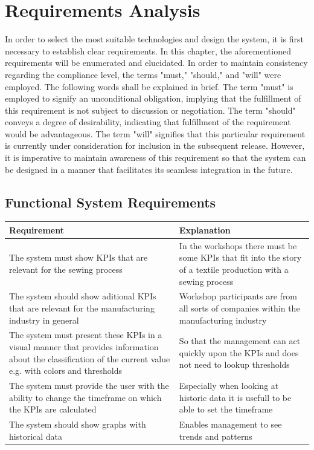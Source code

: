 \chapter{\textbf{Requirements Analysis}}\label{grundlagen}
In order to select the most suitable technologies and design the system, it is first necessary to establish clear requirements. In this chapter, the aforementioned requirements will be enumerated and elucidated.
In order to maintain consistency regarding the compliance level, the terms "must," "should," and "will" were employed.
The following words shall be explained in brief. The term "must" is employed to signify an unconditional obligation, implying that the fulfillment of this requirement is not subject to discussion or negotiation. The term "should" conveys a degree of desirability, indicating that fulfillment of the requirement would be advantageous. The term "will" signifies that this particular requirement is currently under consideration for inclusion in the subsequent release. However, it is imperative to maintain awareness of this requirement so that the system can be designed in a manner that facilitates its seamless integration in the future.
\section{Functional System Requirements} %
\begin{tabularx}{\textwidth}{|X|X|}
	\hline
\textbf{Requirement}	& \textbf{Explanation} \\
	\hline
The system must show KPIs that are relevant for the sewing process	&  In the workshops there must be some KPIs that fit into the story of a textile production with a sewing process\\
	\hline
The system should show aditional KPIs that are relevant for the manufacturing industry in general	&  Workshop participants are from all sorts of companies within the manufacturing industry\\
	\hline
 The system must present these KPIs in a visual manner that provides information about the classification of the current value e.g. with colors and thresholds	& So that the management can act quickly upon the KPIs and does not need to lookup thresholds \\
	\hline
The system must provide the user with the ability to change the timeframe on which the KPIs are calculated	&  Especially when looking at historic data it is usefull to be able to set the timeframe\\
	\hline
The system should show graphs with historical data & Enables management to see trends and patterns\\
	\hline
\end{tabularx}

